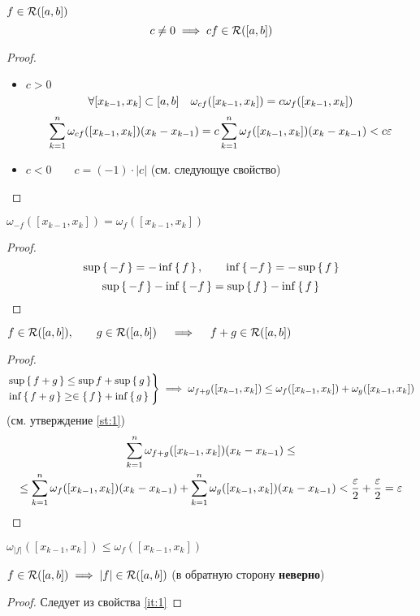 \begin{props}
	\item $ f \in \mathcal{R}([a, b]) $
	$$ c \ne 0 \implies cf \in \mathcal{R}([a, b]) $$
	\begin{proof}
		\hfill
		\begin{itemize}
			\item $ c > 0 $
			$$ \forall [x_{k - 1}, x_k] \subset [a, b] \quad \omega_{cf}([x_{k - 1}, x_k]) = c\omega_f([x_{k - 1}, x_k]) $$
			$$ \sum_{k = 1}^n \omega_{cf}([x_{k - 1}, x_k])(x_k - x_{k - 1}) = c \sum_{k = 1}^n \omega_f([x_{k - 1}, x_k])(x_k - x_{k - 1}) < c\varepsilon $$
			\item $ c < 0 \qquad c = (-1) \cdot |c| $ (см. следующуе свойство)
		\end{itemize}
	\end{proof}
	\item $ \omega_{-f} ([x_{k - 1}, x_k]) = \omega_f([x_{k - 1}, x_k]) $
	\begin{proof}
		$$ \sup\set{-f} = -\inf\set{f}, \qquad \inf\set{-f} = -\sup\set{f} $$
		$$ \sup\set{-f} - \inf\set{-f} = \sup\set{f} - \inf\set{f} $$
	\end{proof}
	\item $ f \in \mathcal{R}([a, b]), \qquad g \in \mathcal{R}([a, b]) \quad \implies \quad f + g \in \mathcal{R}([a, b]) $
	\begin{proof}
		$$
		\begin{rcases}
			\sup\set{f + g} \le \sup{f} + \sup\set{g} \\
			\inf\set{f + g} \ge \in\set{f} + \inf\set{g}
		\end{rcases} \implies \omega_{f + g}([x_{k - 1}, x_k]) \le \omega_f([x_{k - 1}, x_k]) + \omega_g([x_{k - 1}, x_k]) $$
		(см. утверждение \ref{st:1})
		\begin{multline*}
			\sum_{k = 1}^n \omega_{f + g}([x_{k - 1}, x_k])(x_k - x_{k - 1}) \le \\ \le \sum_{k = 1}^n \omega_f([x_{k - 1}, x_k])(x_k - x_{k - 1}) + \sum_{k = 1}^n \omega_g([x_{k - 1}, x_k])(x_k - x_{k - 1}) < \frac{\varepsilon}2 + \frac{\varepsilon}2 = \varepsilon
		\end{multline*}
	\end{proof}
	\item \label{it:1} $ \omega_{|f|}([x_{k - 1}, x_k]) \le \omega_f([x_{k - 1}, x_k]) $
	\item $ f \in \mathcal{R}([a, b]) \implies |f| \in \mathcal{R}([a, b]) $ (в обратную сторону \textbf{неверно})
	\begin{proof}
		Следует из свойства \ref{it:1}
	\end{proof}

\end{props}
